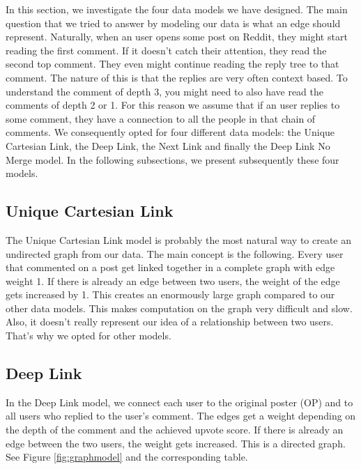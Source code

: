 In this section, we investigate the four data models we have designed. The main question that we tried to answer by modeling our data is what an edge should represent. Naturally, when an user opens some post on Reddit, they might start reading the first comment. If it doesn't catch their attention, they read the second top comment. They even might continue reading the reply tree to that comment. The nature of this is that the replies are very often context based. To understand the comment of depth 3, you might need to also have read the comments of depth 2 or 1. For this reason we assume that if an user replies to some comment, they have a connection to all the people in that chain of comments. We consequently opted for four different data models: the Unique Cartesian Link, the Deep Link, the Next Link and finally the Deep Link No Merge model. In the following subsections, we present subsequently these four models.

\subsection{Unique Cartesian Link}
The Unique Cartesian Link model is probably the most natural way to create an undirected graph from our data. The main concept is the following. Every user that commented on a post get linked together in a complete graph with edge weight 1. If there is already an edge between two users, the weight of the edge gets increased by 1. This creates an enormously large graph compared to our other data models. This makes computation on the graph very difficult and slow. Also, it doesn't really represent our idea of a relationship between two users. That's why we opted for other models.

\subsection{Deep Link}
In the Deep Link model, we connect each user to the original poster (OP) and to all users who replied to the user's comment. The edges get a weight depending on the depth of the comment and the achieved upvote score. If there is already an edge between the two users, the weight gets increased. This is a directed graph. See Figure \ref{fig:graphmodel} and the corresponding table.

